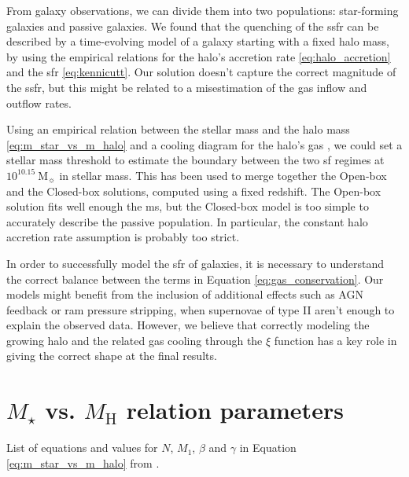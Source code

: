 \documentclass[fleqn, usenatbib]{mnras}
\begin{document}
From galaxy observations, we can divide them into two populations: star-forming galaxies and passive galaxies. We found that the quenching of the \acrshort{ssfr} can be described by a time-evolving model of a galaxy starting with a fixed halo mass, by using the empirical relations for the halo's accretion rate \eqref{eq:halo_accretion} and the \acrlong{sfr} \eqref{eq:kennicutt}. Our solution doesn't capture the correct magnitude of the \acrshort{ssfr}, but this might be related to a misestimation of the gas inflow and outflow rates.

Using an empirical relation between the stellar mass and the halo mass \eqref{eq:m_star_vs_m_halo} and a cooling diagram for the halo's gas \citep[Figure 8.6]{Mo2010}, we could set a stellar mass threshold to estimate the boundary between the two \acrlong{sf} regimes at \(10^{10.15}\ \mathrm{M_{\sun}}\) in stellar mass. This has been used to merge together the Open-box and the Closed-box solutions, computed using a fixed redshift. The Open-box solution fits well enough the \acrshort{ms}, but the Closed-box model is too simple to accurately describe the passive population. In particular, the constant halo accretion rate assumption is probably too strict.

In order to successfully model the \acrlong{sfr} of galaxies, it is necessary to understand the correct balance between the terms in Equation \ref{eq:gas_conservation}. Our models might benefit from the inclusion of additional effects such as AGN feedback or ram pressure stripping, when supernovae of type II aren't enough to explain the observed data. However, we believe that correctly modeling the growing halo and the related gas cooling through the \(\xi\) function has a key role in giving the correct shape at the final results.




\nocite{Bouche2010}


\appendix

\section{\(M_{\star}\) vs. \(M_{\mathrm{H}}\) relation parameters} \label{appendix:m_star_vs_m_halo_parameters}

List of equations and values for \(N\), \(M_1\), \(\beta\) and \(\gamma\) in Equation \ref{eq:m_star_vs_m_halo} from \citet{Moster2012}.
\end{document}
